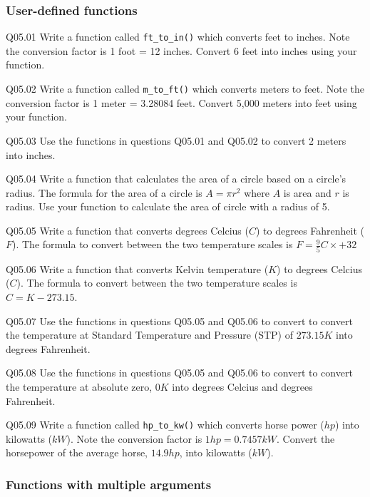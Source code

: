 \documentclass{book}
\newenvironment{problems}{}{}  %
\begin{document}
    
        \begin{problems}
        \subsubsection{User-defined functions}\label{user-defined-functions}

Q05.01 Write a function called \lstinline!ft_to_in()! which converts
feet to inches. Note the conversion factor is 1 foot = 12 inches.
Convert 6 feet into inches using your function.

Q05.02 Write a function called \lstinline!m_to_ft()! which converts
meters to feet. Note the conversion factor is 1 meter = 3.28084 feet.
Convert 5,000 meters into feet using your function.

Q05.03 Use the functions in questions Q05.01 and Q05.02 to convert 2
meters into inches.

Q05.04 Write a function that calculates the area of a circle based on a
circle's radius. The formula for the area of a circle is \(A = \pi r^2\)
where \(A\) is area and \(r\) is radius. Use your function to calculate
the area of circle with a radius of 5.

Q05.05 Write a function that converts degrees Celcius (\(C\)) to degrees
Fahrenheit (\(F\)). The formula to convert between the two temperature
scales is \(F = \frac{9}{5} C \times + 32\)

Q05.06 Write a function that converts Kelvin temperature (\(K\)) to
degrees Celcius (\(C\)). The formula to convert between the two
temperature scales is \(C = K - 273.15\).

Q05.07 Use the functions in questions Q05.05 and Q05.06 to convert to
convert the temperature at Standard Temperature and Pressure (STP) of
\(273.15 K\) into degrees Fahrenheit.

Q05.08 Use the functions in questions Q05.05 and Q05.06 to convert to
convert the temperature at absolute zero, \(0 K\) into degrees Celcius
and degrees Fahrenheit.

Q05.09 Write a function called \lstinline!hp_to_kw()! which converts
horse power (\(hp\)) into kilowatts (\(kW\)). Note the conversion factor
is \(1 hp = 0.7457 kW\). Convert the horsepower of the average horse,
\(14.9 hp\), into kilowatts (\(kW\)).
        \end{problems}

    




    
        \subsubsection{Functions with multiple
arguments}\label{functions-with-multiple-arguments}
\end{document}
